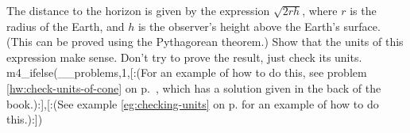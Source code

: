 The distance to the horizon is given by the expression $\sqrt{2rh}$, where $r$ is the
radius of the Earth, and $h$ is the observer's height above the Earth's surface. (This can
be proved using the Pythagorean theorem.) Show that the units of this expression make
sense. Don't try to prove the result, just check its units.
m4_ifelse(__problems,1,[:(For an example of how to do this,
see problem \ref{hw:check-units-of-cone} on p.~\pageref{hw:check-units-of-cone},
which has a solution given in the back of the book.):],[:(See example \ref{eg:checking-units} on p.
\pageref{eg:checking-units} for an example of how to do this.):])

